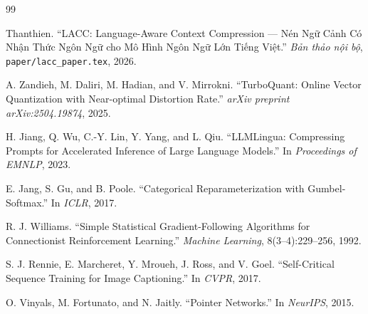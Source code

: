 \documentclass[12pt,a4paper]{article}
\begin{document}

\begin{thebibliography}{99}

Thanthien.
\newblock ``LACC: Language-Aware Context Compression --- Nén Ngữ Cảnh Có Nhận Thức Ngôn Ngữ cho Mô Hình Ngôn Ngữ Lớn Tiếng Việt.''
\newblock \emph{Bản thảo nội bộ}, \texttt{paper/lacc\_paper.tex}, 2026.

A. Zandieh, M. Daliri, M. Hadian, and V. Mirrokni.
\newblock ``TurboQuant: Online Vector Quantization with Near-optimal Distortion Rate.''
\newblock \emph{arXiv preprint arXiv:2504.19874}, 2025.

H. Jiang, Q. Wu, C.-Y. Lin, Y. Yang, and L. Qiu.
\newblock ``LLMLingua: Compressing Prompts for Accelerated Inference of Large Language Models.''
\newblock In \emph{Proceedings of EMNLP}, 2023.

E. Jang, S. Gu, and B. Poole.
\newblock ``Categorical Reparameterization with Gumbel-Softmax.''
\newblock In \emph{ICLR}, 2017.

R. J. Williams.
\newblock ``Simple Statistical Gradient-Following Algorithms for Connectionist Reinforcement Learning.''
\newblock \emph{Machine Learning}, 8(3--4):229--256, 1992.

S. J. Rennie, E. Marcheret, Y. Mroueh, J. Ross, and V. Goel.
\newblock ``Self-Critical Sequence Training for Image Captioning.''
\newblock In \emph{CVPR}, 2017.

O. Vinyals, M. Fortunato, and N. Jaitly.
\newblock ``Pointer Networks.''
\newblock In \emph{NeurIPS}, 2015.

\end{thebibliography}
\end{document}
